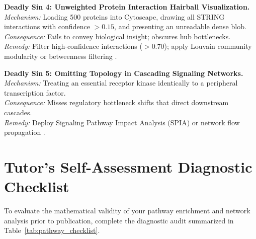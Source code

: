 \documentclass[11pt,oneside]{book}
\begin{document}
\begin{pitfallbox}
\textbf{Deadly Sin 4: Unweighted Protein Interaction Hairball Visualization.}\\
\textit{Mechanism:} Loading 500 proteins into Cytoscape, drawing all STRING interactions with confidence $>0.15$, and presenting an unreadable dense blob.\\
\textit{Consequence:} Fails to convey biological insight; obscures hub bottlenecks.\\
\textit{Remedy:} Filter high-confidence interactions ($>0.70$); apply Louvain community modularity or betweenness filtering \cite{blondel2008fast, barabasi2004network}.
\end{pitfallbox}

\begin{pitfallbox}
\textbf{Deadly Sin 5: Omitting Topology in Cascading Signaling Networks.}\\
\textit{Mechanism:} Treating an essential receptor kinase identically to a peripheral transcription factor.\\
\textit{Consequence:} Misses regulatory bottleneck shifts that direct downstream cascades.\\
\textit{Remedy:} Deploy Signaling Pathway Impact Analysis (SPIA) or network flow propagation \cite{tarca2009signaling, kohler2008walking}.
\end{pitfallbox}

\section{Tutor's Self-Assessment Diagnostic Checklist}

To evaluate the mathematical validity of your pathway enrichment and network analysis prior to publication, complete the diagnostic audit summarized in Table~\ref{tab:pathway_checklist}.
\end{document}
